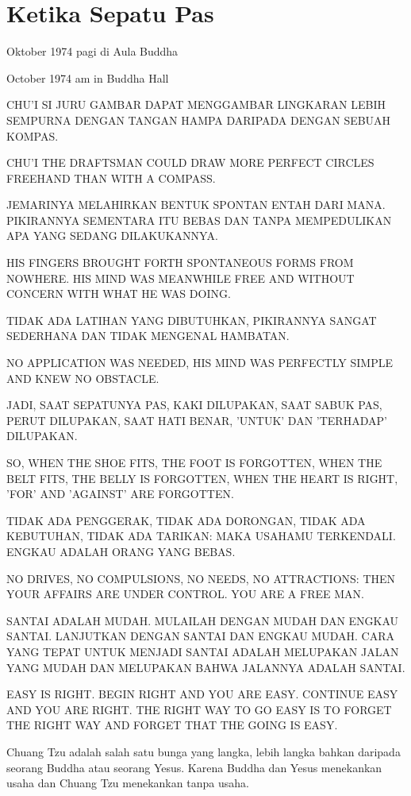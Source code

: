 \chapter{Ketika Sepatu Pas}

 Oktober 1974 pagi di Aula Buddha

 October 1974 am in Buddha Hall

\bahasa
CHU'I SI JURU GAMBAR DAPAT MENGGAMBAR LINGKARAN LEBIH SEMPURNA DENGAN TANGAN HAMPA DARIPADA DENGAN SEBUAH KOMPAS.

\english
CHU'I THE DRAFTSMAN COULD DRAW MORE PERFECT CIRCLES FREEHAND THAN WITH A COMPASS.

\bahasa
JEMARINYA MELAHIRKAN BENTUK SPONTAN ENTAH DARI MANA. PIKIRANNYA SEMENTARA ITU BEBAS DAN TANPA MEMPEDULIKAN APA YANG SEDANG DILAKUKANNYA.

\english
HIS FINGERS BROUGHT FORTH SPONTANEOUS FORMS FROM NOWHERE. HIS MIND WAS MEANWHILE FREE AND WITHOUT CONCERN WITH WHAT HE WAS DOING.

\bahasa
TIDAK ADA LATIHAN YANG DIBUTUHKAN, PIKIRANNYA SANGAT SEDERHANA DAN TIDAK MENGENAL HAMBATAN.

\english
NO APPLICATION WAS NEEDED, HIS MIND WAS PERFECTLY SIMPLE AND KNEW NO OBSTACLE.

\bahasa
JADI, SAAT SEPATUNYA PAS, KAKI DILUPAKAN, SAAT SABUK PAS, PERUT DILUPAKAN, SAAT HATI BENAR, 'UNTUK' DAN 'TERHADAP' DILUPAKAN.

\english
SO, WHEN THE SHOE FITS, THE FOOT IS FORGOTTEN, WHEN THE BELT FITS, THE BELLY IS FORGOTTEN, WHEN THE HEART IS RIGHT, 'FOR' AND 'AGAINST' ARE FORGOTTEN.

\bahasa
TIDAK ADA PENGGERAK, TIDAK ADA DORONGAN, TIDAK ADA KEBUTUHAN, TIDAK ADA TARIKAN: MAKA USAHAMU TERKENDALI. ENGKAU ADALAH ORANG YANG BEBAS.

\english
NO DRIVES, NO COMPULSIONS, NO NEEDS, NO ATTRACTIONS: THEN YOUR AFFAIRS ARE UNDER CONTROL. YOU ARE A FREE MAN.

\bahasa
SANTAI ADALAH MUDAH. MULAILAH DENGAN MUDAH DAN ENGKAU SANTAI. LANJUTKAN DENGAN SANTAI DAN ENGKAU MUDAH. CARA YANG TEPAT UNTUK MENJADI SANTAI ADALAH MELUPAKAN JALAN YANG MUDAH DAN MELUPAKAN BAHWA JALANNYA ADALAH SANTAI.

\english
EASY IS RIGHT. BEGIN RIGHT AND YOU ARE EASY. CONTINUE EASY AND YOU ARE RIGHT. THE RIGHT WAY TO GO EASY IS TO FORGET THE RIGHT WAY AND FORGET THAT THE GOING IS EASY.

\bahasa
Chuang Tzu adalah salah satu bunga yang langka, lebih langka bahkan daripada seorang Buddha atau seorang Yesus. Karena Buddha dan Yesus menekankan usaha dan Chuang Tzu menekankan tanpa usaha.

